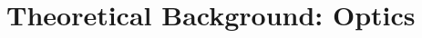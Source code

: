 \renewcommand{\relPath}{SECTION/20_Theory}
\chapter[Theory: Optics]{Theoretical Background: Optics}\label{ch:optic-theory}


